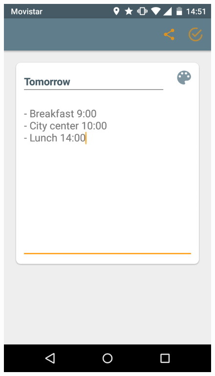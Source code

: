 \begin{itemize}
\begin{figure}[!h]
\centering
\includegraphics[scale=0.12]{Figures/crearNota1.png}

\end{figure}
\end{itemize}
